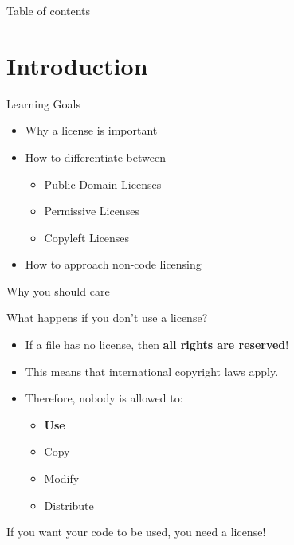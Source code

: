 \documentclass[compress,aspectratio=169]{beamer}
\begin{document}
	\begin{frame}[plain]
		\titlepage
	\end{frame}

	\begin{frame}[t]{Table of contents}
		\tableofcontents[subsectionstyle=hide/hide]
	\end{frame}


	\section{Introduction}

	\begin{frame}{Learning Goals}
		\begin{itemize}
			\item Why a license is important
      \item How to differentiate between
        \begin{itemize}
          \item Public Domain Licenses
          \item Permissive Licenses
          \item Copyleft Licenses
        \end{itemize}
      \item How to approach non-code licensing
		\end{itemize}
	\end{frame}

	\begin{frame}{Why you should care}
    \begin{block}{What happens if you don't use a license? \cite{nolicense}}
      \begin{itemize}
        \item If a file has no license, then \textbf{all rights are reserved}!
          \pause
        \item This means that international copyright laws apply.
          \pause
        \item Therefore, nobody is allowed to:
          \begin{itemize}
            \item \textbf{Use}
            \item Copy
            \item Modify
            \item Distribute
          \end{itemize}
      \end{itemize}
    \end{block}
    \begin{center}
      \Large If you want your code to be used, you need a license!
    \end{center}
	\end{frame}
\end{document}
